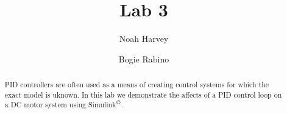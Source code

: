 \documentclass[a4paper,titlepage]{article}
\begin{document}
\title{Lab 3}
\author{Noah Harvey}
\author{Bogie Rabino}

\maketitle

\begin{abstract}
	PID controllers are often used as a means of creating control systems for
	which the exact model is uknown. In this lab we demonstrate the affects of a
	PID control loop on a DC motor system using Simulink$^\copyright$.
\end{abstract}

\tableofcontents
\listoftables
\listoffigures

\pagebreak





\end{document}
